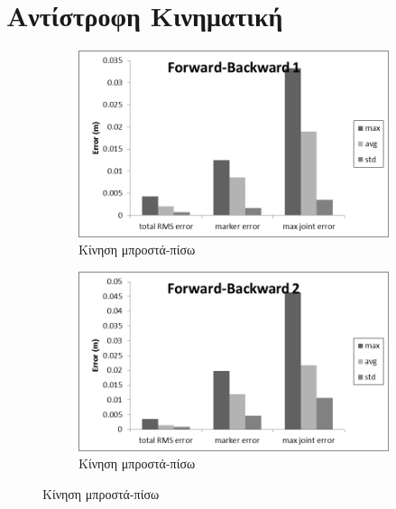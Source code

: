 \section{Αντίστροφη Κινηματική}

\begin{figure}[H]
    \centering
    \begin{subfigure}[t]{.48\textwidth}
        \includegraphics[width=\textwidth, keepaspectratio]{fig/ik-reg1.png}
        \caption{Κίνηση μπροστά-πίσω}
        \label{fig:forth-back1}
    \end{subfigure}
    \begin{subfigure}[t]{.48\textwidth}
        \includegraphics[width=\textwidth, keepaspectratio]{fig/ik-reg6.png}
        \caption{Κίνηση μπροστά-πίσω}
        \label{fig:forth-back2}
    \end{subfigure}


\end{figure}
